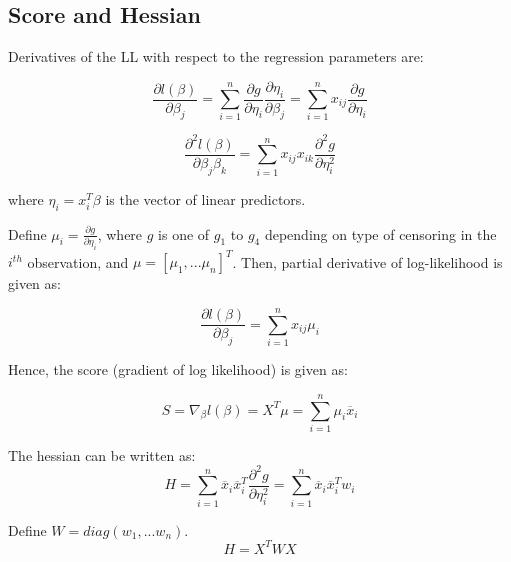 \documentclass[12pt,a4paper]{report}
\begin{document}
\subsection*{Score and Hessian}

Derivatives of the LL with respect to the regression parameters are:

\begin{equation}
 \frac{\partial l(\beta)}{\partial \beta_j} = \sum_{i=1}^n \frac{\partial g}{\partial \eta_i}\frac{\partial \eta_i}{\partial \beta_j} = \sum_{i=1}^n x_{ij} \frac{\partial g}{\partial \eta_i}
\end{equation}

\begin{equation}
 \frac{\partial^2 l(\beta)}{\partial \beta_j \beta_k} = \sum_{i=1}^n x_{ij} x_{ik} \frac{\partial^2 g}{\partial \eta_i^2}
\end{equation}

where $\eta_i = x_i^T \beta$ is the vector of linear predictors.

\vspace{5mm}

Define $\mu_i = \frac{\partial g}{\partial \eta_i}$, where $g$ is one of $g_1$ to $g_4$ depending on type of censoring in the $i^{th}$ observation, and $\mu = [\mu_1, ... \mu_n]^T$. Then, partial derivative of log-likelihood is given as:

\begin{equation}
\frac{\partial l(\beta)}{\partial \beta_j} = \sum_{i=1}^n x_{ij} \mu_i
\end{equation}

Hence, the score (gradient of log likelihood) is given as:

\begin{equation} \label{score}
S = \nabla_{\beta} l(\beta) = X^T \mu = \sum_{i=1}^n \mu_i \overline x_i
\end{equation}

The hessian can be written as:
\begin{equation} \label{w_i}
H = \sum_{i=1}^n  \overline x_i \overline x_i^T \frac{\partial^2 g}{\partial \eta_i^2}
 = \sum_{i=1}^n  \overline x_i \overline x_i^T w_i
\end{equation}

Define $W=diag(w_1, ... w_n)$.
\begin{equation}
H = X^T W X
\end{equation}
\end{document}
